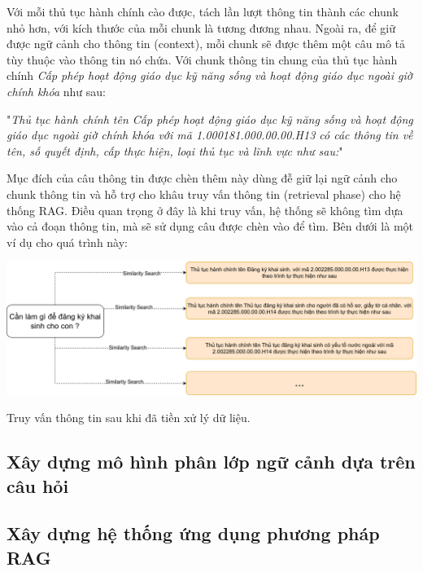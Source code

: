 \documentclass[a4paper, 12pt, openany]{book}
\begin{document}
Với mỗi thủ tục hành chính cào được, tách lần lượt thông tin thành các chunk nhỏ hơn, với kích thước của mỗi chunk 
là tương đương nhau. Ngoài ra, để giữ được ngữ cảnh cho thông tin (context), mỗi chunk sẽ được thêm một câu mô tả tùy thuộc vào thông tin nó chứa.
Với chunk thông tin chung của thủ tục hành chính \textit{Cấp phép hoạt động giáo dục kỹ năng sống và hoạt động giáo dục ngoài giờ chính khóa} như sau:

\vspace{0.5cm}
"\textit{Thủ tục hành chính tên Cấp phép hoạt động giáo dục kỹ năng sống và hoạt động giáo dục ngoài giờ chính khóa với mã 1.000181.000.00.00.H13 có các thông tin về  tên, số quyết định, cấp thực hiện, loại thủ tục và lĩnh vực như sau:}"

Mục đích của câu thông tin được chèn thêm này dùng đễ giữ lại ngữ cảnh cho chunk thông tin và hỗ trợ cho khâu truy vấn thông tin (retrieval phase) cho hệ thống RAG.
Điều quan trọng ở đây là khi truy vấn, hệ thống sẽ không tìm dựa vào cả đoạn thông tin, mà sẽ sử dụng câu
được chèn vào để tìm. Bên dưới là một ví dụ cho quá trình này:

\begin{minipage}{\linewidth}
    \centering
    \includegraphics[width=\linewidth]{./assets/images/search.drawio.png}
    \captionsetup{type=figure}
    \caption{Truy vấn thông tin sau khi đã tiền xử lý dữ liệu.}
\end{minipage}

\subsection{Xây dựng mô hình phân lớp ngữ cảnh dựa trên câu hỏi}



\subsection{Xây dựng hệ thống ứng dụng phương pháp RAG}
\end{document}
